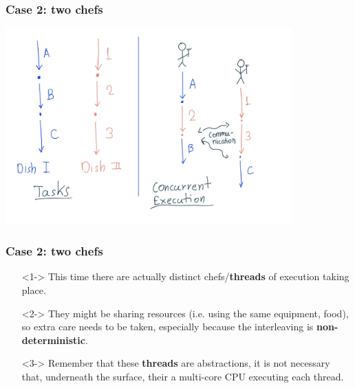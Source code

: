\documentclass[xcolor={dvipsnames,svgnames},aspectratio=169]{beamer}
\begin{document}
\begin{frame}[fragile]
  \frametitle{Case 2: two chefs}

  \begin{center}
    \includegraphics[width=11cm,keepaspectratio]{../media/lecture1-twochefs.png}
  \end{center}

\end{frame}

\begin{frame}[fragile]
  \frametitle{Case 2: two chefs}

  \large{
    \begin{itemize}
    \item[\faBook]<1-> This time there are actually distinct chefs/\textbf{threads} of
      execution taking place.
    \item[\faBook]<2-> They might be sharing resources (i.e. using the same
      equipment, food), so extra care needs to be taken, especially because the
      interleaving is \textbf{non-deterministic}.
    \item[\faBook]<3-> Remember that these \textbf{threads} are abstractions, it
      is not necessary that, underneath the surface, their a multi-core CPU
      executing each thread.
    \end{itemize}}
\end{frame}
\end{document}
